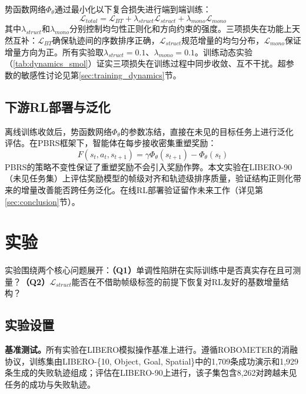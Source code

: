 势函数网络$\Phi_\theta$通过最小化以下复合损失进行端到端训练：
\begin{equation}
\label{eq:total_loss}
    \mathcal{L}_{total} = \mathcal{L}_{BT} + \lambda_{struct} \mathcal{L}_{struct} + \lambda_{mono} \mathcal{L}_{mono}
\end{equation}
其中$\lambda_{struct}$和$\lambda_{mono}$分别控制均匀性正则化和方向约束的强度。三项损失在功能上天然互补：$\mathcal{L}_{BT}$确保轨迹间的序数排序正确，$\mathcal{L}_{struct}$规范增量的均匀分布，$\mathcal{L}_{mono}$保证增量方向为正。所有实验取$\lambda_{struct} = 0.1$、$\lambda_{mono} = 0.1$。训练动态实验（\cref{tab:dynamics_smol}）证实三项损失在训练过程中同步收敛、互不干扰。超参数的敏感性讨论见第\ref{sec:training_dynamics}节。

\subsection{下游RL部署与泛化}

离线训练收敛后，势函数网络$\Phi_\theta$的参数冻结，直接在未见的目标任务上进行泛化评估。在PBRS框架下，智能体在每步接收密集重塑奖励：
\begin{equation}
\label{eq:deploy}
    F(s_t, a_t, s_{t+1}) = \gamma \Phi_\theta(s_{t+1}) - \Phi_\theta(s_t)
\end{equation}
PBRS的策略不变性保证了重塑奖励不会引入奖励作弊。本文实验在LIBERO-90（未见任务集）上评估奖励模型的帧级对齐和轨迹级排序质量，验证结构正则化带来的增量改善能否跨任务泛化。在线RL部署验证留作未来工作（详见第\ref{sec:conclusion}节）。



\clearpage

\section{实验}

实验围绕两个核心问题展开：\textbf{（Q1）}单调性陷阱在实际训练中是否真实存在且可测量？\textbf{（Q2）}$\mathcal{L}_{struct}$能否在不借助帧级标签的前提下恢复对RL友好的基数增量结构？

\subsection{实验设置}

\textbf{基准测试。}所有实验在LIBERO模拟操作基准\cite{liu2023}上进行。遵循ROBOMETER的消融协议\cite{liang2026}，训练集由LIBERO-\{10, Object, Goal, Spatial\}中的1,709条成功演示和1,929条生成的失败轨迹组成；评估在LIBERO-90上进行，该子集包含8,262对跨越未见任务的成功与失败轨迹。

